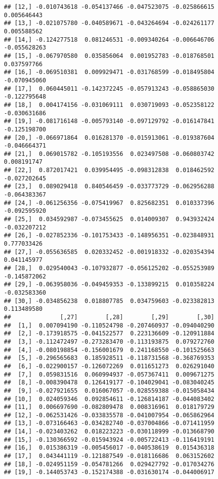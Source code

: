 \documentclass[
]{book}
\begin{document}
\begin{verbatim}
## [12,] -0.010743618 -0.054137466 -0.047523075 -0.025866615  0.005646443
## [13,] -0.021075780 -0.040589671 -0.043264694 -0.024261177  0.005588562
## [14,] -0.124277518  0.081246531 -0.009340264 -0.006646706 -0.055628263
## [15,] -0.067970580  0.035856064  0.001952783 -0.018768501  0.037597766
## [16,] -0.069510381  0.009929471 -0.031768599 -0.018495804 -0.070945060
## [17,]  0.060445011 -0.142372245 -0.057913243 -0.058865030 -0.122795648
## [18,]  0.004174156 -0.031069111  0.030719093 -0.052358122 -0.030631686
## [19,] -0.081716148 -0.005793140 -0.097129792 -0.016147841 -0.125198700
## [20,] -0.066971864  0.016281370 -0.015913061 -0.019387604 -0.046664371
## [21,]  0.069015782 -0.105193556  0.023497508 -0.060803742  0.008191747
## [22,]  0.872017421  0.039954495 -0.098312838  0.018462592 -0.027202645
## [23,]  0.089029418  0.840546459 -0.033773729 -0.062956288 -0.064383367
## [24,] -0.061256356 -0.075419967  0.825682351  0.010337396 -0.092595920
## [25,]  0.034592987 -0.073455625  0.014009307  0.943932424 -0.032207212
## [26,] -0.027852336 -0.101753433 -0.148956351 -0.023848931  0.777033426
## [27,] -0.055636585  0.020332452 -0.001918332 -0.020354394  0.041145977
## [28,]  0.029540043 -0.107932877 -0.056125202 -0.055253989 -0.145872062
## [29,] -0.063958036 -0.049459353 -0.133899215  0.010358224 -0.032583360
## [30,] -0.034856238  0.018807785  0.034759603 -0.023382813  0.113489580
##              [,27]        [,28]        [,29]        [,30]
##  [1,]  0.007094190 -0.110524798 -0.207460937 -0.094040290
##  [2,] -0.173918575 -0.041522577  0.223136609 -0.120911884
##  [3,] -0.112472497 -0.273283470 -0.113193875  0.079272760
##  [4,] -0.080198854 -0.156001679  0.241168550 -0.101525663
##  [5,] -0.296565683  0.185928511 -0.118731568 -0.368769353
##  [6,] -0.022900157 -0.126072269  0.011651273  0.026291040
##  [7,]  0.059831516  0.060994937 -0.057367411  0.009671275
##  [8,] -0.008390478  0.126419177 -0.104029041 -0.083040245
##  [9,] -0.027921655  0.016067057 -0.028559388 -0.015058434
## [10,]  0.024059346  0.092854611 -0.126814187 -0.044083402
## [11,]  0.006697690 -0.082809478  0.008316961  0.018179729
## [12,] -0.062531426 -0.033835578 -0.041007954 -0.065862964
## [13,] -0.073166463 -0.034282740 -0.037004866 -0.071411959
## [14,] -0.023403262  0.018223223 -0.030118999 -0.013668790
## [15,] -0.130366592 -0.015943924 -0.005722413 -0.116419191
## [16,]  0.015386319 -0.005456017 -0.040538619  0.015436318
## [17,]  0.043441119 -0.121887549 -0.018116686  0.063152602
## [18,] -0.024951159 -0.054781266  0.029427792 -0.017034276
## [19,] -0.144053743 -0.152174388 -0.031630174 -0.044006917

\end{verbatim}
\end{document}
